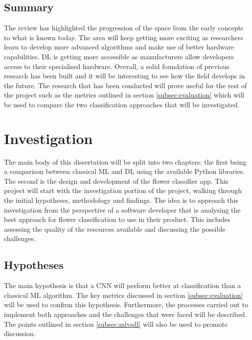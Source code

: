 \documentclass[12pt,a4paper]{report}
\begin{document}
\section{Summary}

The review has highlighted the progression of the space from the early concepts to what is known today. 
The area will keep getting more exciting as researchers learn to develop more advanced
algorithms and make use of better hardware capabilities. DL is getting more
accessible as manufacturers allow developers access to their specialised hardware.
Overall, a solid foundation of previous research has been built and it will be interesting 
to see how the field develops in the future. The research that has been conducted will prove useful for the rest of the 
project such as the metrics outlined in section \ref{subsec:evaluation} which will be used to compare the 
two classification approaches that will be investigated.

\clearpage

\chapter{Investigation}

\label{chap:invest}

The main body of this dissertation will be split into two chapters: the first being a comparison
between classical ML and DL using the available Python libraries. The second is 
the design and development of the flower classifier app. This project will start with the investigation portion of the project,
walking through the initial hypotheses, methodology and findings. The idea is to approach this investigation from the 
perspective of a software developer that is analysing the best approach for flower classification to use in 
their product. This includes assessing the quality of the resources available and discussing the possible challenges.

\section{Hypotheses}

The main hypothesis is that a CNN will perform better at classification than a classical ML algorithm. The key metrics 
discussed in section \ref{subsec:evaluation} will be used to confirm this hypothesis. Furthermore, the processes carried
out to implement both approaches and the challenges that were faced will be described. The points outlined in section 
\ref{subsec:mlvsdl} will also be used to promote discussion. 
\end{document}
